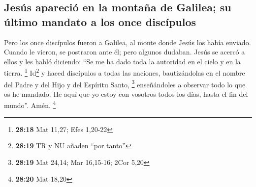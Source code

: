 \hypertarget{jesuxfas-apareciuxf3-en-la-montauxf1a-de-galilea-su-uxfaltimo-mandato-a-los-once-discuxedpulos}{%
\subsection{Jesús apareció en la montaña de Galilea; su último mandato a
los once
discípulos}\label{jesuxfas-apareciuxf3-en-la-montauxf1a-de-galilea-su-uxfaltimo-mandato-a-los-once-discuxedpulos}}

 Pero los once discípulos fueron a Galilea, al monte
donde Jesús los había enviado.  Cuando le vieron, se
postraron ante él; pero algunos dudaban.  Jesús se acercó
a ellos y les habló diciendo: ``Se me ha dado toda la autoridad en el
cielo y en la tierra. \footnote{\textbf{28:18} Mat 11,27; Efes 1,20-22}
 Id\footnote{\textbf{28:19} TR y NU añaden ``por tanto''}
y haced discípulos a todas las naciones, bautizándolas en el nombre del
Padre y del Hijo y del Espíritu Santo, \footnote{\textbf{28:19} Mat
  24,14; Mar 16,15-16; 2Cor 5,20}  enseñándoles a
observar todo lo que os he mandado. He aquí que yo estoy con vosotros
todos los días, hasta el fin del mundo''. Amén. \footnote{\textbf{28:20}
  Mat 18,20}
